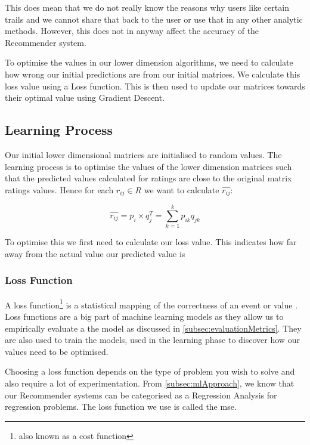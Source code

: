 This does mean that we do not really know the reasons why users like certain trails and we cannot share that back to the user or use that in any other analytic methods. However, this does not in anyway affect the accuracy of the Recommender system. 

To optimise the values in our lower dimension algorithms, we need to calculate how wrong our initial predictions are from our initial matrices. We calculate this loss value using a Loss function. This is then used to update our matrices towards their optimal value using Gradient Descent.



\subsection{Learning Process}
Our initial lower dimensional matrices are initialised to random values. The learning process is to optimise the values of the lower dimension matrices such that the predicted values calculated for ratings are close to the original matrix ratings values. Hence for each $r_{ij} \in R$ we want to calculate $\hat{r_{ij}}$:

\begin{equation}
    \hat{r_{ij}} = p_i \times q_j^T = \sum_{k=1}^{k}{p_{ik}q_{jk}}
\end{equation}

To optimise this we first need to calculate our loss value. This indicates how far away from the actual value our predicted value is

\subsubsection{Loss Function}
A loss function\footnote{also known as a cost function} is a statistical mapping of the correctness of an event or value \cite{wald1950statistical}. Loss functions are a big part of machine learning models as they allow us to empirically evaluate a the model as discussed in \autoref{subsec:evaluationMetrics}. They are also used to train the models, used in the learning phase to discover how our values need to be optimised. 

Choosing a loss function depends on the type of problem you wish to solve and also require a lot of experimentation. From \autoref{subsec:mlApproach}, we know that our Recommender systems can be categorised as a Regression Analysis for regression problems. The loss function we use is called the \acrfull{mse}.

